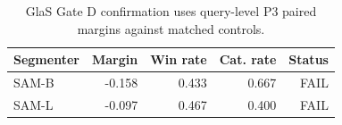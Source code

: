 \begin{table}[t]
\centering
\caption{GlaS Gate D confirmation uses query-level P3 paired margins against matched controls.}
\begin{tabular}{lrrrr}
\hline
Segmenter & Margin & Win rate & Cat. rate & Status \\
\hline
SAM-B & -0.158 & 0.433 & 0.667 & FAIL \\
SAM-L & -0.097 & 0.467 & 0.400 & FAIL \\
\hline
\end{tabular}
\end{table}
